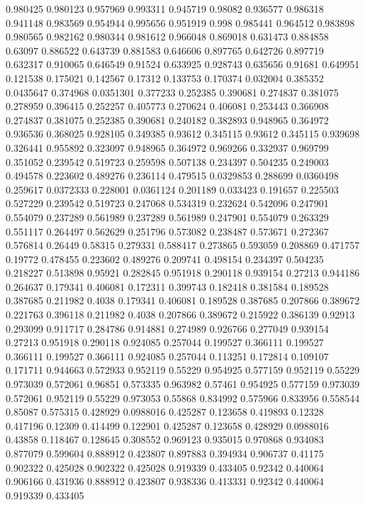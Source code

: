 0.980425 0.980123
0.957969 0.993311
0.945719 0.98082
0.936577 0.986318
0.941148 0.983569
0.954944 0.995656
0.951919 0.998
0.985441 0.964512
0.983898 0.980565
0.982162 0.980344
0.981612 0.966048
0.869018 0.631473
0.884858 0.63097
0.886522 0.643739
0.881583 0.646606
0.897765 0.642726
0.897719 0.632317
0.910065 0.646549
0.91524 0.633925
0.928743 0.635656
0.91681 0.649951
0.121538 0.175021
0.142567 0.17312
0.133753 0.170374
0.032004 0.385352
0.0435647 0.374968
0.0351301 0.377233
0.252385 0.390681
0.274837 0.381075
0.278959 0.396415
0.252257 0.405773
0.270624 0.406081
0.253443 0.366908
0.274837 0.381075
0.252385 0.390681
0.240182 0.382893
0.948965 0.364972
0.936536 0.368025
0.928105 0.349385
0.93612 0.345115
0.93612 0.345115
0.939698 0.326441
0.955892 0.323097
0.948965 0.364972
0.969266 0.332937
0.969799 0.351052
0.239542 0.519723
0.259598 0.507138
0.234397 0.504235
0.249003 0.494578
0.223602 0.489276
0.236114 0.479515
0.0329853 0.288699
0.0360498 0.259617
0.0372333 0.228001
0.0361124 0.201189
0.033423 0.191657
0.225503 0.527229
0.239542 0.519723
0.247068 0.534319
0.232624 0.542096
0.247901 0.554079
0.237289 0.561989
0.237289 0.561989
0.247901 0.554079
0.263329 0.551117
0.264497 0.562629
0.251796 0.573082
0.238487 0.573671
0.272367 0.576814
0.26449 0.58315
0.279331 0.588417
0.273865 0.593059
0.208869 0.471757
0.19772 0.478455
0.223602 0.489276
0.209741 0.498154
0.234397 0.504235
0.218227 0.513898
0.95921 0.282845
0.951918 0.290118
0.939154 0.27213
0.944186 0.264637
0.179341 0.406081
0.172311 0.399743
0.182418 0.381584
0.189528 0.387685
0.211982 0.4038
0.179341 0.406081
0.189528 0.387685
0.207866 0.389672
0.221763 0.396118
0.211982 0.4038
0.207866 0.389672
0.215922 0.386139
0.92913 0.293099
0.911717 0.284786
0.914881 0.274989
0.926766 0.277049
0.939154 0.27213
0.951918 0.290118
0.924085 0.257044
0.199527 0.366111
0.199527 0.366111
0.199527 0.366111
0.924085 0.257044
0.113251 0.172814
0.109107 0.171711
0.944663 0.572933
0.952119 0.55229
0.954925 0.577159
0.952119 0.55229
0.973039 0.572061
0.96851 0.573335
0.963982 0.57461
0.954925 0.577159
0.973039 0.572061
0.952119 0.55229
0.973053 0.55868
0.834992 0.575966
0.833956 0.558544
0.85087 0.575315
0.428929 0.0988016
0.425287 0.123658
0.419893 0.12328
0.417196 0.12309
0.414499 0.122901
0.425287 0.123658
0.428929 0.0988016
0.43858 0.118467
0.128645 0.308552
0.969123 0.935015
0.970868 0.934083
0.877079 0.599604
0.888912 0.423807
0.897883 0.394934
0.906737 0.41175
0.902322 0.425028
0.902322 0.425028
0.919339 0.433405
0.92342 0.440064
0.906166 0.431936
0.888912 0.423807
0.938336 0.413331
0.92342 0.440064
0.919339 0.433405
